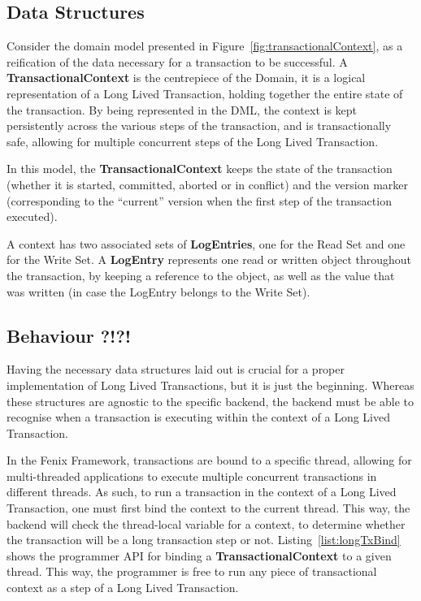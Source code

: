 \subsection{Data Structures}

Consider the domain model presented in
Figure~\ref{fig:transactionalContext}, as a reification of the data
necessary for a transaction to be successful. A {\bf
  TransactionalContext} is the centrepiece of the Domain, it is a
logical representation of a Long Lived Transaction, holding together
the entire state of the transaction. By being represented in the DML,
the context is kept persistently across the various steps of the
transaction, and is transactionally safe, allowing for multiple
concurrent steps of the Long Lived Transaction.

In this model, the {\bf TransactionalContext} keeps the state of the
transaction (whether it is started, committed, aborted or in
conflict) and the version marker (corresponding to the ``current''
version when the first step of the transaction executed).

A context has two associated sets of {\bf LogEntries}, one for the
Read Set and one for the Write Set. A {\bf LogEntry} represents one
read or written object throughout the transaction, by keeping a
reference to the object, as well as the value that was written (in
case the LogEntry belongs to the Write Set).

\subsection{Behaviour ?!?!}

Having the necessary data structures laid out is crucial for a proper
implementation of Long Lived Transactions, but it is just the
beginning. Whereas these structures are agnostic to the specific
backend, the backend must be able to recognise when a transaction is
executing within the context of a Long Lived Transaction.

In the Fenix Framework, transactions are bound to a specific thread,
allowing for multi-threaded applications to execute multiple
concurrent transactions in different threads. As such, to run a
transaction in the context of a Long Lived Transaction, one must first
bind the context to the current thread. This way, the backend will
check the thread-local variable for a context, to determine whether 
the transaction will be a long transaction step or
not. Listing~\ref{list:longTxBind} shows the programmer API for
binding a {\bf TransactionalContext} to a given thread. This way, the
programmer is free to run any piece of transactional context as a step
of a Long Lived Transaction.

